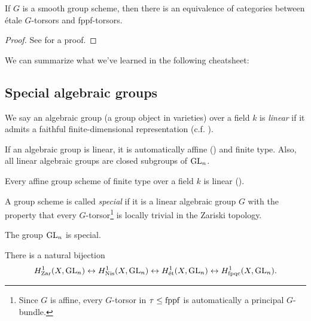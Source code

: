 \documentclass[11pt,openany]{book}
\begin{document}
\begin{corollary} If $G$ is a smooth group scheme, then there is an equivalence of categories between \'etale $G$-torsors and fppf-torsors.
\end{corollary}
\begin{proof} See \cite[Proposition~4]{chd} for a proof.
\end{proof}

We can summarize what we've learned in the following cheatsheet:





\subsection{Special algebraic groups}


\begin{definition} We say an algebraic group (a group object in varieties) over a field $k$ is \textit{linear} if it admits a faithful finite-dimensional representation (c.f. \cite[p.~72]{MilneAG}).
\end{definition}

\begin{note} If an algebraic group is linear, it is automatically affine (\cite[1.29]{MilneAG}) and finite type. Also, all linear algebraic groups are closed subgroups of $\mathrm{GL}_n$.
\end{note}


\begin{proposition} Every affine group scheme of finite type over a field $k$ is linear (\cite[4.8]{MilneAG}).
\end{proposition}



\begin{definition} \cite[p.~5-11]{Grothendieck-torsion} A group scheme is called \textit{special} if it is a linear algebraic group $G$ with the property that every $G$-torsor\footnote{Since $G$ is affine, every $G$-torsor in $\tau\le \mathrm{fppf}$ is automatically a principal $G$-bundle.} is locally trivial in the Zariski topology.
\end{definition}

\begin{theorem} \cite[Th\'eor\`eme~3]{Grothendieck-torsion} The group $\mathrm{GL}_n$ is special.
\end{theorem}

\begin{corollary} \cite[11.4]{MilneLEC} There is a natural bijection
\begin{align*}
    H^1_{\mathrm{Zar}}(X,\mathrm{GL}_n) \leftrightarrow H^1_{\mathrm{Nis}}(X,\mathrm{GL}_n) \leftrightarrow H^1_{\text{\'{e}t}}(X,\mathrm{GL}_n) \leftrightarrow H^1_{\mathrm{fpqc}}(X,\mathrm{GL}_n).
\end{align*}
\end{corollary}
\end{document}
